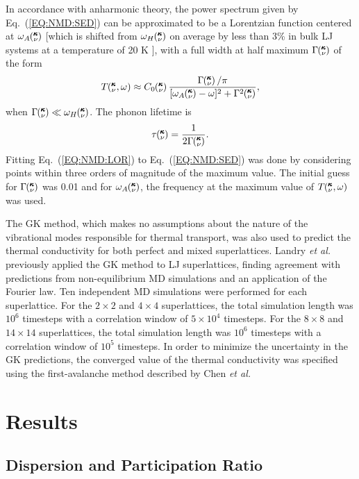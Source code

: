\documentclass[aps,prb,preprint,preprintnumbers,amsmath,amssymb,floatfix,superscriptaddress]{revtex4}
\newcommand{\kvw}{\mspace{-4.0mu}\left(\mspace{-8.0mu}
\begin{smallmatrix}&\pmb{\kappa} \\&\nu\end{smallmatrix}
\mspace{-2.0mu},\omega\right)}
\newcommand{\kv}{\mspace{-4.0mu}\left(\mspace{-8.0mu}
\begin{smallmatrix}&\pmb{\kappa} \\&\nu\end{smallmatrix}
\mspace{-3.0mu}\right)}
\begin{document}
In accordance with anharmonic theory,\cite{maradudin_scattering_1962} the power spectrum given by Eq.~(\ref{EQ:NMD:SED}) can be approximated to be a Lorentzian function centered at $\omega_A\kv$ [which is shifted from $\omega_H\kv$ on average by less than 3\% in bulk LJ systems at a temperature of 20 K \cite{PhysRevB.79.064301}],  with a full width at half maximum $\Gamma\kv$ of the form 
\begin{equation}\label{EQ:NMD:LOR}
T\kvw \approx C_0\kv\frac{\Gamma\kv/\pi}{[\omega_A\kv-\omega]^2+\Gamma^2\kv},
\end{equation}
when $\Gamma\kv \ll \omega_H\kv$. The phonon lifetime is\cite {maradudin_scattering_1962}
\begin{equation}\label{EQ:lifetime}
\tau\kv=\frac{1}{2\Gamma\kv}.
\end{equation}
Fitting Eq.~(\ref{EQ:NMD:LOR}) to Eq.~(\ref{EQ:NMD:SED}) was done by considering points within three orders of magnitude of the maximum value. The initial guess for $\Gamma\kv$ was 0.01 and for $\omega_A\kv$, the frequency at the maximum value of $T\kvw$ was used. 

The GK method, which makes no assumptions about the nature of the vibrational modes responsible for thermal transport, was also used to predict the thermal conductivity for both perfect and mixed superlattices. Landry \textit{et al.} previously applied the GK method to LJ superlattices, finding agreement with predictions from non-equilibrium MD simulations and an application of the Fourier law.\cite{PhysRevB.79.075316}
Ten independent MD simulations were performed for each superlattice. For the $2 \times 2$ and $4 \times 4$ superlattices, the total  simulation length was $10^6$ timesteps with a correlation window of $5\times 10^4$ timesteps.  For the $8 \times 8$ and $14 \times 14$ superlattices, the total  simulation length was $10^6$ timesteps with a correlation window of $10^5$ timesteps. In order to minimize the uncertainty in the GK predictions, the converged value of the thermal conductivity was specified using the first-avalanche method described by Chen \textit{et al.} \cite{Chen20102392}

\section{Results}\label{SEC:results}
\subsection{Dispersion and Participation Ratio}
\end{document}
